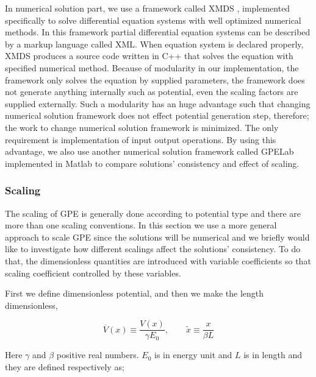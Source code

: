 \documentclass[a4paper,times,hidelinks,12pt]{article}
\begin{document}
In numerical solution part, we use a framework called XMDS \cite{dennis2013xmds2}, implemented specifically to solve differential equation systems with well optimized numerical methods. In this framework partial differential equation systems can be described by a markup language called XML.  When equation system is declared properly, XMDS produces a source code written in C++ that solves the equation with specified numerical method. Because of modularity in our implementation, the framework only solves the equation by supplied parameters, the framework does not generate anything internally such as potential, even the scaling factors are supplied externally. Such a modularity has an huge advantage such that changing numerical solution framework does not effect potential generation step, therefore; the work to change numerical solution framework is minimized. The only requirement is implementation of input output operations. By using this advantage, we also use another numerical solution framework called GPELab \cite{antoine2014gpelab} implemented in Matlab to compare solutions' consistency and effect of scaling.


\subsubsection{Scaling}

The scaling of GPE is generally done according to potential type and there are more than one scaling conventions. In this section we use a more general approach to scale GPE since the solutions will be numerical and we briefly would like to investigate how different scalings affect the solutions' consistency. To do that, the dimensionless quantities are introduced with variable coefficients so that scaling coefficient controlled by these variables. 

First we define dimensionless potential, and then we make the length dimensionless,



$$ \overline{V}(x) \equiv \frac{V(x)}{\gamma E_0}, \qquad \widetilde{x} \equiv \frac{x}{\beta L} $$

\noindent Here $\gamma$ and $\beta$ positive real numbers. $E_0$ is in energy unit and $L$ is in length and they are defined respectively as;
\end{document}
